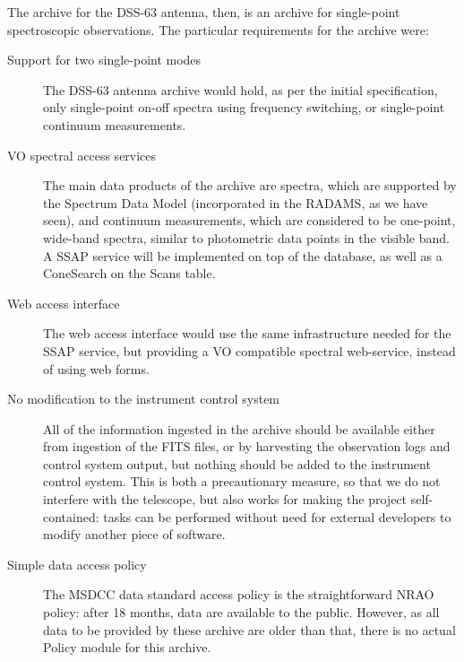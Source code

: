 			The archive for the DSS-63 antenna, then, is an
			archive for single-point spectroscopic observations.
			The particular requirements for the archive were:
			
			\begin{description}
				\item[Support for two single-point modes] The
				DSS-63 antenna archive would hold, as per the
				initial specification, only single-point on-off
				spectra using frequency switching, or
				single-point continuum measurements.
				
				\item[VO spectral access services] The main data
				products of the archive are spectra, which are
				supported by the Spectrum Data Model (incorporated
				in the RADAMS, as we have seen), and continuum
				measurements, which are considered to be one-point,
				wide-band spectra, similar to photometric data
				points in the visible band. A SSAP service will
				be implemented on top of the database, as well
				as a ConeSearch on the Scans table.
				
				\item[Web access interface] The web access
				interface would use the same infrastructure needed
				for the SSAP service, but providing a VO compatible
				spectral web-service, instead of using web forms.
				
				\item[No modification to the instrument control
				system] All of the information ingested in the
				archive should be available either from ingestion
				of the FITS files, or by harvesting the observation
				logs and control system output, but nothing should
				be added to the instrument control system. This is
				both a precautionary measure, so that we do not
				interfere with the telescope, but also works for
				making the project self-contained: tasks can be
				performed without need for external developers to
				modify another piece of software.
				
				\item[Simple data access policy] The MSDCC data
				standard access policy is the
				straightforward NRAO policy: after 18 months, data
				are available to the public. However, as all data
				to be provided by these archive are older than that,
				there is no actual Policy module for this archive.
			\end{description}
			
		
